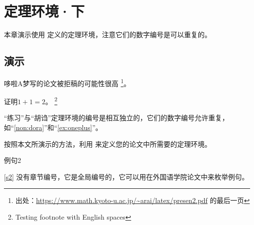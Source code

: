 \chapter{定理环境·下}

本章演示使用  定义的定理环境，注意它们的数字编号是可以重复的。

\section{演示}

\begin{nonsense}
\label{non:dora}
哆啦A梦写的论文被拒稿的可能性很高
\footnote{出处：\url{https://www.math.kyoto-u.ac.jp/~arai/latex/presen2.pdf} 的最后一页}。
\end{nonsense}

\begin{exercise}
\label{ex:oneplus}
证明$1+1 = 2$。
\footnote{Testing footnote with English spaces}
\end{exercise}

\begin{nonsense}[右边的胡诌是真的]
“练习”与“胡诌”定理环境的编号是相互独立的，它们的数字编号允许重复，
如“\autoref{non:dora}”和“\autoref{ex:oneplus}”。
\end{nonsense}

\begin{exercise}
按照本文所演示的方法，利用  来定义您的论文中所需要的定理环境。
\end{exercise}

\begin{lines}
\label{s2}
例句2
\end{lines}

\autoref{s2} 没有章节编号，它是全局编号的，它可以用在外国语学院论文中来枚举例句。
